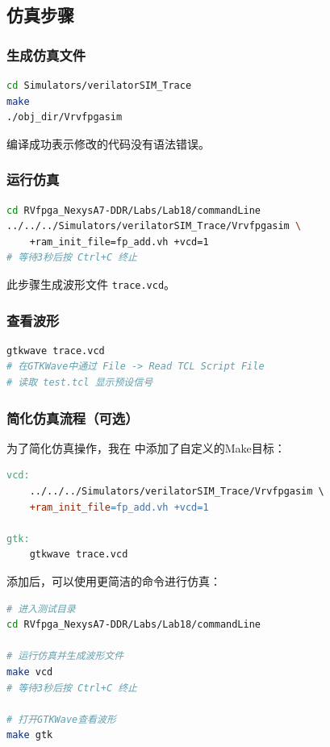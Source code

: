 \documentclass[12pt,a4paper]{article}
\begin{document}
\subsection{仿真步骤}

\subsubsection{生成仿真文件}
\begin{lstlisting}[language=bash]
cd Simulators/verilatorSIM_Trace
make
./obj_dir/Vrvfpgasim
\end{lstlisting}

编译成功表示修改的代码没有语法错误。

\subsubsection{运行仿真}
\begin{lstlisting}[language=bash]
cd RVfpga_NexysA7-DDR/Labs/Lab18/commandLine
../../../Simulators/verilatorSIM_Trace/Vrvfpgasim \
    +ram_init_file=fp_add.vh +vcd=1
# 等待3秒后按 Ctrl+C 终止
\end{lstlisting}

此步骤生成波形文件 \texttt{trace.vcd}。

\subsubsection{查看波形}
\begin{lstlisting}[language=bash]
gtkwave trace.vcd
# 在GTKWave中通过 File -> Read TCL Script File 
# 读取 test.tcl 显示预设信号
\end{lstlisting}

\subsubsection{简化仿真流程（可选）}

为了简化仿真操作，我在  中添加了自定义的Make目标：

\begin{lstlisting}[language=make]
vcd:
	../../../Simulators/verilatorSIM_Trace/Vrvfpgasim \
	+ram_init_file=fp_add.vh +vcd=1

gtk:
	gtkwave trace.vcd
\end{lstlisting}

添加后，可以使用更简洁的命令进行仿真：

\begin{lstlisting}[language=bash]
# 进入测试目录
cd RVfpga_NexysA7-DDR/Labs/Lab18/commandLine

# 运行仿真并生成波形文件
make vcd
# 等待3秒后按 Ctrl+C 终止

# 打开GTKWave查看波形
make gtk
\end{lstlisting}
\end{document}
